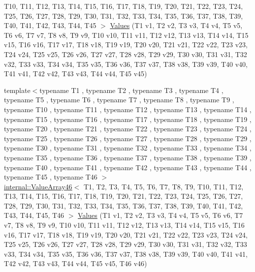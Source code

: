\begin{DoxyCompactItemize}
\-T10, \-T11, \-T12, \-T13, \-T14, \-T15, \*
\-T16, \-T17, \-T18, \-T19, \-T20, \-T21, \*
\-T22, \-T23, \-T24, \-T25, \-T26, \-T27, \*
\-T28, \-T29, \-T30, \-T31, \-T32, \-T33, \*
\-T34, \-T35, \-T36, \-T37, \-T38, \-T39, \*
\-T40, \-T41, \-T42, \-T43, \-T44, \-T45 $>$ \hyperlink{namespacetesting_a227b4b3b251f5f4aa0e1261c27fe9dd4}{\-Values} (\-T1 v1, \-T2 v2, \-T3 v3, \-T4 v4, \-T5 v5, \-T6 v6, \-T7 v7, \-T8 v8, \-T9 v9, \-T10 v10, \-T11 v11, \-T12 v12, \-T13 v13, \-T14 v14, \-T15 v15, \-T16 v16, \-T17 v17, \-T18 v18, \-T19 v19, \-T20 v20, \-T21 v21, \-T22 v22, \-T23 v23, \-T24 v24, \-T25 v25, \-T26 v26, \-T27 v27, \-T28 v28, \-T29 v29, \-T30 v30, \-T31 v31, \-T32 v32, \-T33 v33, \-T34 v34, \-T35 v35, \-T36 v36, \-T37 v37, \-T38 v38, \-T39 v39, \-T40 v40, \-T41 v41, \-T42 v42, \-T43 v43, \-T44 v44, \-T45 v45)
\item 
{\footnotesize template$<$typename T1 , typename T2 , typename T3 , typename T4 , typename T5 , typename T6 , typename T7 , typename T8 , typename T9 , typename T10 , typename T11 , typename T12 , typename T13 , typename T14 , typename T15 , typename T16 , typename T17 , typename T18 , typename T19 , typename T20 , typename T21 , typename T22 , typename T23 , typename T24 , typename T25 , typename T26 , typename T27 , typename T28 , typename T29 , typename T30 , typename T31 , typename T32 , typename T33 , typename T34 , typename T35 , typename T36 , typename T37 , typename T38 , typename T39 , typename T40 , typename T41 , typename T42 , typename T43 , typename T44 , typename T45 , typename T46 $>$ }\\\hyperlink{classtesting_1_1internal_1_1ValueArray46}{internal\-::\-Value\-Array46}$<$ \-T1, \-T2, \*
\-T3, \-T4, \-T5, \-T6, \-T7, \-T8, \-T9, \*
\-T10, \-T11, \-T12, \-T13, \-T14, \-T15, \*
\-T16, \-T17, \-T18, \-T19, \-T20, \-T21, \*
\-T22, \-T23, \-T24, \-T25, \-T26, \-T27, \*
\-T28, \-T29, \-T30, \-T31, \-T32, \-T33, \*
\-T34, \-T35, \-T36, \-T37, \-T38, \-T39, \*
\-T40, \-T41, \-T42, \-T43, \-T44, \-T45, \*
\-T46 $>$ \hyperlink{namespacetesting_a8f5536906a9d6780467c8ae53a420dad}{\-Values} (\-T1 v1, \-T2 v2, \-T3 v3, \-T4 v4, \-T5 v5, \-T6 v6, \-T7 v7, \-T8 v8, \-T9 v9, \-T10 v10, \-T11 v11, \-T12 v12, \-T13 v13, \-T14 v14, \-T15 v15, \-T16 v16, \-T17 v17, \-T18 v18, \-T19 v19, \-T20 v20, \-T21 v21, \-T22 v22, \-T23 v23, \-T24 v24, \-T25 v25, \-T26 v26, \-T27 v27, \-T28 v28, \-T29 v29, \-T30 v30, \-T31 v31, \-T32 v32, \-T33 v33, \-T34 v34, \-T35 v35, \-T36 v36, \-T37 v37, \-T38 v38, \-T39 v39, \-T40 v40, \-T41 v41, \-T42 v42, \-T43 v43, \-T44 v44, \-T45 v45, \-T46 v46)

\end{DoxyCompactItemize}
